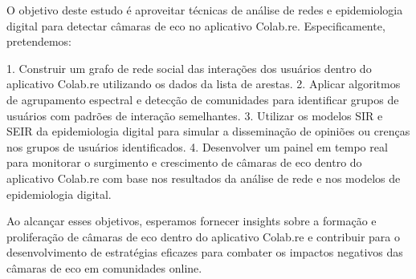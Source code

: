O objetivo deste estudo é aproveitar técnicas de análise de redes e epidemiologia digital para detectar câmaras de eco no aplicativo Colab.re. Especificamente, pretendemos:

1. Construir um grafo de rede social das interações dos usuários dentro do aplicativo Colab.re utilizando os dados da lista de arestas.
2. Aplicar algoritmos de agrupamento espectral e detecção de comunidades para identificar grupos de usuários com padrões de interação semelhantes.
3. Utilizar os modelos SIR e SEIR da epidemiologia digital para simular a disseminação de opiniões ou crenças nos grupos de usuários identificados.
4. Desenvolver um painel em tempo real para monitorar o surgimento e crescimento de câmaras de eco dentro do aplicativo Colab.re com base nos resultados da análise de rede e nos modelos de epidemiologia digital.

Ao alcançar esses objetivos, esperamos fornecer insights sobre a formação e proliferação de câmaras de eco dentro do aplicativo Colab.re e contribuir para o desenvolvimento de estratégias eficazes para combater os impactos negativos das câmaras de eco em comunidades online.
